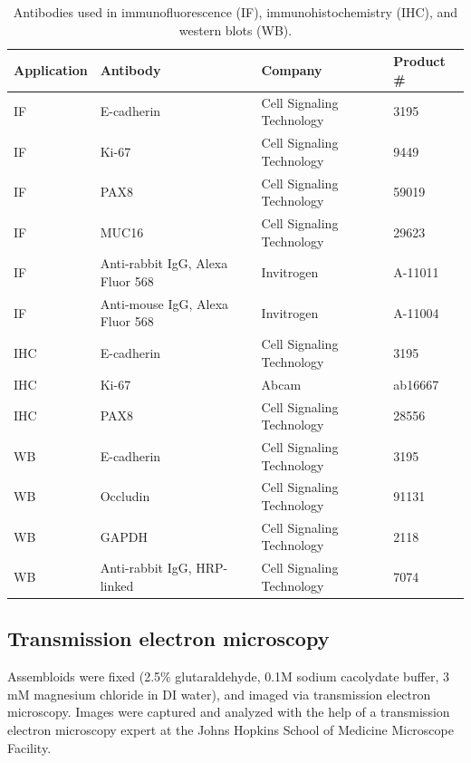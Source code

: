 \begin{refsection}
    \begin{table}[htbp]
        \centering
        \footnotesize %
        \renewcommand{\arraystretch}{1.2} %
        \caption{Antibodies used in immunofluorescence (IF), immunohistochemistry (IHC), and western blots (WB).}
        \label{chapter4_table_S1}
        \begin{tabularx}{\textwidth}{l l l l}
            \toprule
            \textbf{Application} & \textbf{Antibody} & \textbf{Company} & \textbf{Product \#} \\
            \midrule
            IF  & E-cadherin                  & Cell Signaling Technology & 3195  \\
            IF  & Ki-67                      & Cell Signaling Technology & 9449  \\
            IF  & PAX8                       & Cell Signaling Technology & 59019 \\
            IF  & MUC16                      & Cell Signaling Technology & 29623 \\
            IF  & Anti-rabbit IgG, Alexa Fluor 568 & Invitrogen        & A-11011 \\
            IF  & Anti-mouse IgG, Alexa Fluor 568  & Invitrogen        & A-11004 \\
            IHC & E-cadherin                  & Cell Signaling Technology & 3195  \\
            IHC & Ki-67                      & Abcam                    & ab16667 \\
            IHC & PAX8                       & Cell Signaling Technology & 28556 \\
            WB  & E-cadherin                  & Cell Signaling Technology & 3195  \\
            WB  & Occludin                   & Cell Signaling Technology & 91131 \\
            WB  & GAPDH                      & Cell Signaling Technology & 2118  \\
            WB  & Anti-rabbit IgG, HRP-linked & Cell Signaling Technology & 7074  \\
            \bottomrule
        \end{tabularx}
    \end{table}
    
    \subsection{Transmission electron microscopy}
    Assembloids were fixed (2.5\% glutaraldehyde, 0.1M sodium cacolydate buffer, 3 mM magnesium chloride in DI water), and imaged via transmission electron microscopy. Images were captured and analyzed with the help of a transmission electron microscopy expert at the Johns Hopkins School of Medicine Microscope Facility.
    

\end{refsection}
